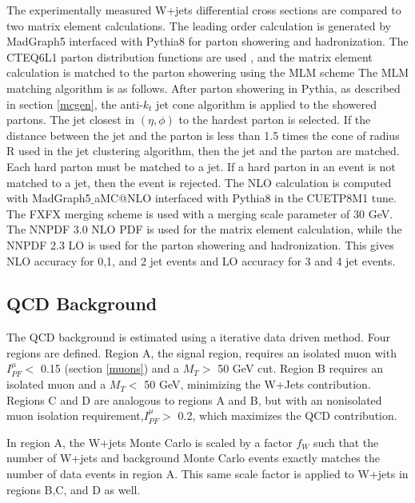 \documentclass[oneside, letterpaper, oldfontcommands]{memoir}
\begin{document}
\qquad The experimentally measured W+jets differential cross sections are compared to two matrix element calculations. The leading order calculation is generated by {\sc MadGraph}5 interfaced with {\sc Pythia}8 for parton showering and hadronization. The CTEQ6L1 parton distribution functions are used \cite{Manohar:2012pe}, and the matrix element calculation is matched to the parton showering using the MLM scheme \cite{Alwall:2008qv}\cite{Alwall:2007fs} The MLM matching algorithm is as follows. After parton showering in {\sc Pythia}, as described in section \ref{mcgen}, the anti-$k_{t}$ jet cone algorithm is applied to the showered partons. The jet closest in $(\eta, \phi)$ to the hardest parton is selected. If the distance between the jet and the parton is less than 1.5 times the cone of radius R used in the jet clustering algorithm, then the jet and the parton are matched. Each hard parton must be matched to a jet. If a hard parton in an event is not matched to a jet, then the event is rejected. The NLO calculation is computed with {\sc MadGraph5$\_$aMC@NLO} interfaced with {\sc Pythia}8 in the CUETP8M1 tune. The FXFX merging scheme \cite{Frederix:2012ps} is used with a merging scale parameter of 30 GeV. The NNPDF 3.0 NLO PDF \cite{Ball:2014uwa} is used for the matrix element calculation, while the NNPDF 2.3 LO \cite{Ball:2010de}\cite{Ball:2011mu} is used for the parton showering and hadronization. This gives NLO accuracy for 0,1, and 2 jet events and LO accuracy for 3 and 4 jet events. 

\subsection{QCD Background}\label{qcdestimate}

\qquad The QCD background is estimated using a iterative data driven method. Four regions are defined. Region A, the signal region, requires an isolated muon with $I_{PF}^{\mu}<$  0.15 (section \ref{muons}) and a $M_{T} >$ 50 GeV cut. Region B requires an isolated muon and a $M_{T} <$ 50 GeV, minimizing the W+Jets contribution. Regions C and D are analogous to regions A and B, but with an nonisolated muon isolation requirement,$I_{PF}^{\mu}>$  0.2,  which maximizes the QCD contribution. 

\qquad In region A, the W+jets Monte Carlo is scaled by a factor $f_{W}$ such that the number of W+jets and background Monte Carlo events exactly matches the number of data events in region A. This same scale factor is applied to W+jets in regions B,C, and D as well.
\end{document}
